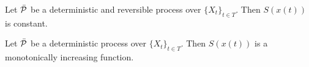 \documentclass[letterpaper]{article}
\begin{document}
\begin{prop}
	Let $\tdomain[P]$ be a deterministic and reversible process over $\{X_t\}_{t \in T}$. Then $S(x(t))$ is constant.
\end{prop}

\begin{prop}
	Let $\tdomain[P]$ be a deterministic process over $\{X_t\}_{t \in T}$. Then $S(x(t))$ is a monotonically increasing function.
\end{prop}


\end{document}
